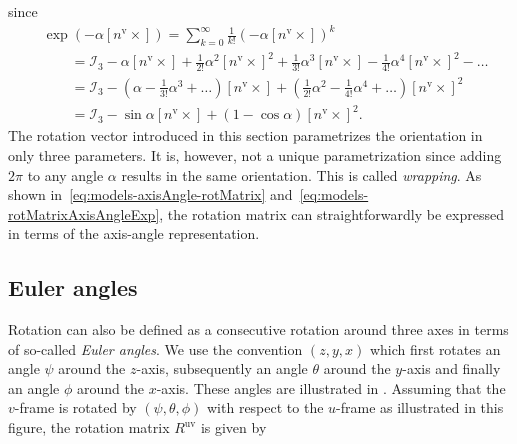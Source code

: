 since 
\begin{align}
\label{eq:models-rotMatrixAxisAngle}
&\exp \left( - \alpha [n^\text{v} \times] \right) = \sum_{k = 0}^\infty \tfrac{1}{k!} \left( - \alpha [n^\text{v} \times] \right)^k \nonumber \\
&\qquad = \mathcal{I}_3 - \alpha [n^\text{v} \times] + \tfrac{1}{2!} \alpha^2 [n^\text{v} \times]^2 + 
\tfrac{1}{3!} \alpha^3 [n^\text{v} \times] - 
\tfrac{1}{4!} \alpha^4 [n^\text{v} \times]^2 - \hdots \nonumber \\
&\qquad= \mathcal{I}_3 - \left( \alpha - \tfrac{1}{3!} \alpha^3 + \hdots \right) [n^\text{v} \times] + 
\left( \tfrac{1}{2!} \alpha^2 - \tfrac{1}{4!} \alpha^4 + \hdots \right) [n^\text{v} \times]^2 \nonumber \\
&\qquad= \mathcal{I}_3 - \sin\alpha [n^\text{v} \times] + (1-\cos\alpha)[n^\text{v} \times]^2.
\end{align}
The rotation vector introduced in this section parametrizes the orientation in only three parameters. It is, however, not a unique parametrization since adding $2 \pi$ to any angle $\alpha$ results in the same orientation. This is called \emph{wrapping}. As shown in~\eqref{eq:models-axisAngle-rotMatrix} and~\eqref{eq:models-rotMatrixAxisAngleExp}, the rotation matrix can straightforwardly be expressed in terms of the axis-angle representation. 

\subsection{Euler angles}
Rotation can also be defined as a consecutive rotation around three axes in terms of so-called \emph{Euler angles}. We use the convention $(z,y,x)$ which first rotates an angle $\psi$ around the $z$-axis, subsequently an angle $\theta$ around the $y$-axis and finally an angle $\phi$ around the $x$-axis. These angles are illustrated in . Assuming that the $v$-frame is rotated by $(\psi, \theta, \phi)$ with respect to the $u$-frame as illustrated in this figure, the rotation matrix $R^\text{uv}$ is given by 

